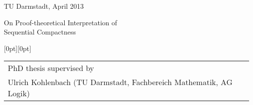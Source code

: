 \begin{titlepage}


\vspace*{.5cm}

{\hspace*{0pt}\color{titlegray}\normalsize TU Darmstadt, April 2013}

\vspace*{2.2cm}


{\Huge
 \filinner
 \sffamily{}\selectfont
 {On Proof-theoretical Interpretation of\\}
 \filinner
 \sffamily{}\selectfont
 {Sequential Compactness\\}
}

\vspace{11cm}

\vspace{2cm}
\raisebox{0.7cm}[0pt][0pt]
{%
  \normalsize
  \vspace{-1cm}
  \hfill
  \begin{tabular}{@{}l}
    PhD thesis supervised by \\
    Ulrich Kohlenbach {\color{titlegray} {(TU Darmstadt, Fachbereich Mathematik, AG Logik)}}
  \end{tabular}
}


\end{titlepage}

\newpage
\thispagestyle{empty}


